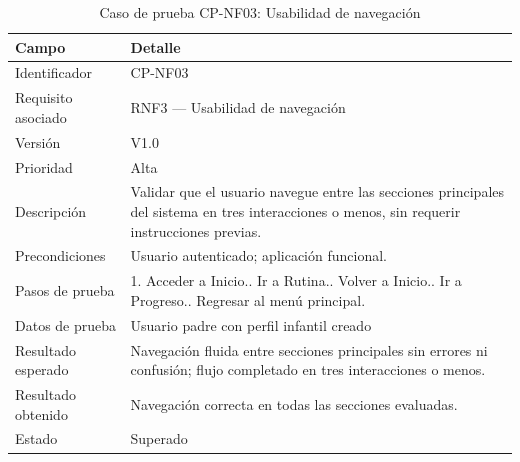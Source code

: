 				\begin{table}[H]
					\centering\small
					\caption{Caso de prueba CP-NF03: Usabilidad de navegación}
					\label{tab:cpnf03}
					\begin{tabular}{p{3cm}p{12.0cm}}
						\hline
						\textbf{Campo} & \textbf{Detalle}\\
						\hline
						Identificador & CP-NF03\\
						Requisito asociado & RNF3 --- Usabilidad de navegación\\
						Versión & V1.0\\
						Prioridad & Alta\\
						Descripción & Validar que el usuario navegue entre las secciones principales del sistema en tres interacciones o menos, sin requerir instrucciones previas.\\
						Precondiciones & Usuario autenticado; aplicación funcional.\\
						Pasos de prueba & 1. Acceder a Inicio.\newline 2. Ir a Rutina.\newline 3. Volver a Inicio.\newline 4. Ir a Progreso.\newline 5. Regresar al menú principal.\\
						Datos de prueba & Usuario padre con perfil infantil creado\\
						Resultado esperado & Navegación fluida entre secciones principales sin errores ni confusión; flujo completado en tres interacciones o menos.\\
						Resultado obtenido & Navegación correcta en todas las secciones evaluadas.\\
						Estado & Superado\\
						\hline
					\end{tabular}
				\end{table}
				\tblnote
				
